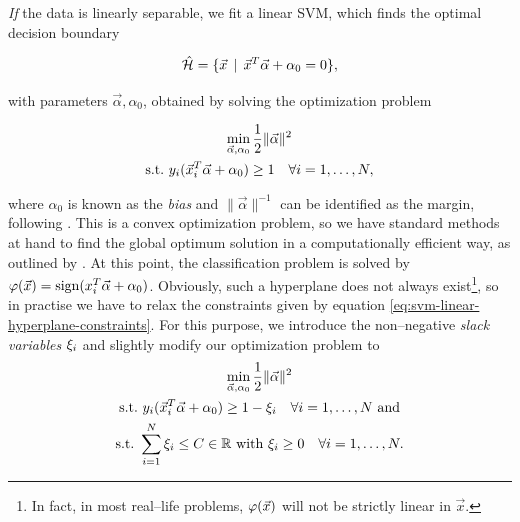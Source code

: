 

\emph{If} the data is linearly separable, we fit a linear SVM, which finds the optimal decision boundary

\begin{equation}
\hat {\mathcal{H}} = \{ \vec x \, \mid \, \vec x^T \vec \alpha + \alpha_0 = 0 \},
\end{equation}

with parameters $\vec \alpha, \alpha_0$, obtained by solving the optimization problem

\begin{gather}
\label{eq:svm-linear-hyperplane}
\min_{\vec \alpha, \alpha_0} \frac{1}{2} \| \vec \alpha \|^2 \\
\label{eq:svm-linear-hyperplane-constraints}
\text{\st} y_i (\vec x_i^T \vec \alpha + \alpha_0) \ge 1 \quad \forall i = 1, \ldots, N,
\end{gather}

where $\alpha_0$ is known as the \emph{bias} and $\|\vec \alpha \|^{-1}$ can be identified as the margin, following \citet{hastie2001}. This is a convex optimization problem, so we have standard methods at hand to find the global optimum solution in a computationally efficient way, as outlined by \citet{vanderplas2015}. At this point, the classification problem is solved by $\varphi(\vec x) = \operatorname{sign}(x_i^T \vec \alpha + \alpha_0)$. Obviously, such a hyperplane does not always exist\footnote{In fact, in most real--life problems, $\varphi(\vec x)$ will not be strictly linear in $\vec x$.}, so in practise we have to relax the constraints given by equation \eqref{eq:svm-linear-hyperplane-constraints}. For this purpose, we introduce the non--negative \emph{slack variables} $\xi_i$ and slightly modify our optimization problem to \\


\begin{gather}
\label{eq:svm-linear-hyperplane-relaxed}
\min_{\vec \alpha, \alpha_0} \frac{1}{2} \| \vec \alpha \|^2 \\
\text{\st} y_i (\vec x_i^T \vec \alpha + \alpha_0) \ge 1 - \slack_i \quad \forall i = 1, \ldots, N \text{\ and} \\
\text{\st} \sum\limits_{i=1}^{N} \slack_i \le C \in \mathbb{R} \text{\ with\ } \slack_i \ge 0 \quad \forall i = 1, \ldots, N.
\end{gather}

